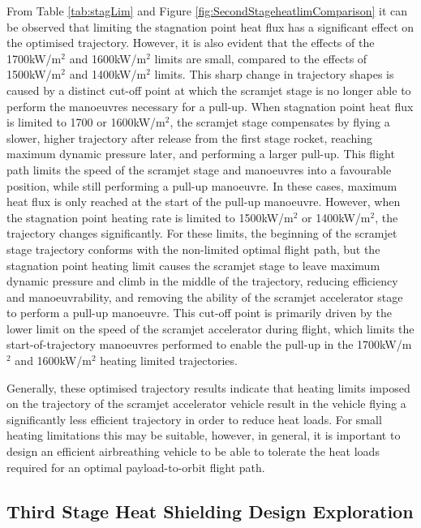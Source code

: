 From Table \ref{tab:stagLim} and Figure \ref{fig:SecondStageheatlimComparison} it can be observed that limiting the stagnation point heat flux has a significant effect on the optimised trajectory. However, it is also evident that the effects of the 1700kW/m$^2$ and 1600kW/m$^2$ limits are small, compared to the effects of 1500kW/m$^2$ and 1400kW/m$^2$ limits. 
This sharp change in trajectory shapes is caused by a distinct cut-off point at which the scramjet stage is no longer able to perform the manoeuvres necessary for a pull-up. When stagnation point heat flux is limited to 1700 or 1600kW/m$^2$, the scramjet stage compensates by flying a slower, higher trajectory after release from the first stage rocket, reaching maximum dynamic pressure later, and performing a larger pull-up. This flight path limits the speed of the scramjet stage and manoeuvres into a favourable position, while still performing a pull-up manoeuvre. In these cases, maximum heat flux is only reached at the start of the pull-up manoeuvre. However, when the stagnation point heating rate is limited to 1500kW/m$^2$ or 1400kW/m$^2$, the trajectory changes significantly. For these limits, the beginning of the scramjet stage trajectory conforms with the non-limited optimal flight path, but the stagnation point heating limit causes the scramjet stage to leave maximum dynamic pressure and climb in the middle of the trajectory, reducing efficiency and manoeuvrability, and removing the ability of the scramjet accelerator stage to perform a pull-up manoeuvre. This cut-off point is primarily driven by the lower limit on the speed of the scramjet accelerator during flight, which limits the start-of-trajectory manoeuvres performed to enable the pull-up in the 1700kW/m$^2$ and 1600kW/m$^2$ heating limited trajectories. 

Generally, these optimised trajectory results indicate that heating limits imposed on the trajectory of the scramjet accelerator vehicle result in the vehicle flying a significantly less efficient trajectory in order to reduce heat loads.
For small heating limitations this may be suitable, however, in general, it is important to design an efficient airbreathing vehicle to be able to tolerate the heat loads required for an optimal payload-to-orbit flight path. 



\subsection{Third Stage Heat Shielding Design Exploration}\label{sec:thirdstageheat}

